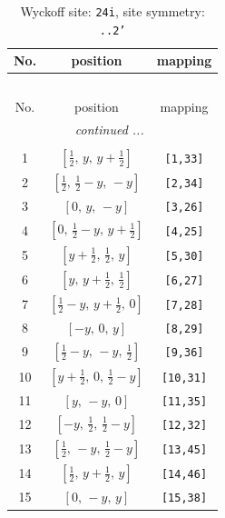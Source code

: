 \documentclass[fleqn,8pt]{jsarticle}
\begin{document}
\begin{longtable}{ccc}
\caption{Wyckoff site: {\tt 24i}, site symmetry: {\tt ..2'}}
 \\
 \hline \hline
No. & position & mapping \\ \hline \endfirsthead

\multicolumn{2}{l}{\tablename\ \thetable{}} \\
 \hline \hline
No. & position & mapping \\ \hline \endhead

 \hline \hline
\multicolumn{2}{r}{\footnotesize\it continued ...} \\ \endfoot

 \hline \hline
\multicolumn{2}{r}{} \\ \endlastfoot

1 & $\left[ \frac{1}{2},\, y,\, y + \frac{1}{2} \right]$ & {\tt [1,33]} \\ \hline
2 & $\left[ \frac{1}{2},\, \frac{1}{2} - y,\, - y \right]$ & {\tt [2,34]} \\ \hline
3 & $\left[ 0,\, y,\, - y \right]$ & {\tt [3,26]} \\ \hline
4 & $\left[ 0,\, \frac{1}{2} - y,\, y + \frac{1}{2} \right]$ & {\tt [4,25]} \\ \hline
5 & $\left[ y + \frac{1}{2},\, \frac{1}{2},\, y \right]$ & {\tt [5,30]} \\ \hline
6 & $\left[ y,\, y + \frac{1}{2},\, \frac{1}{2} \right]$ & {\tt [6,27]} \\ \hline
7 & $\left[ \frac{1}{2} - y,\, y + \frac{1}{2},\, 0 \right]$ & {\tt [7,28]} \\ \hline
8 & $\left[ - y,\, 0,\, y \right]$ & {\tt [8,29]} \\ \hline
9 & $\left[ \frac{1}{2} - y,\, - y,\, \frac{1}{2} \right]$ & {\tt [9,36]} \\ \hline
10 & $\left[ y + \frac{1}{2},\, 0,\, \frac{1}{2} - y \right]$ & {\tt [10,31]} \\ \hline
11 & $\left[ y,\, - y,\, 0 \right]$ & {\tt [11,35]} \\ \hline
12 & $\left[ - y,\, \frac{1}{2},\, \frac{1}{2} - y \right]$ & {\tt [12,32]} \\ \hline
13 & $\left[ \frac{1}{2},\, - y,\, \frac{1}{2} - y \right]$ & {\tt [13,45]} \\ \hline
14 & $\left[ \frac{1}{2},\, y + \frac{1}{2},\, y \right]$ & {\tt [14,46]} \\ \hline
15 & $\left[ 0,\, - y,\, y \right]$ & {\tt [15,38]} \\ \hline

\end{longtable}
\end{document}
